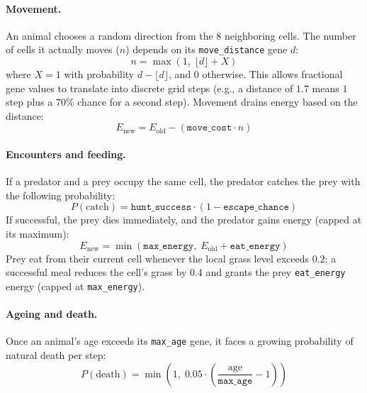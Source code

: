 \documentclass[english]{projectreport}
\begin{document}
\paragraph{Movement.} An animal chooses a random direction from the 8 neighboring cells. The number of cells it actually moves ($n$) depends on its \texttt{move\_distance} gene $d$:
\begin{equation}
n = \max(1,\; \lfloor d \rfloor + X)
\label{eq:cells_moved}
\end{equation}
where $X = 1$ with probability $d - \lfloor d \rfloor$, and $0$ otherwise. This allows fractional gene values to translate into discrete grid steps (e.g., a distance of $1.7$ means $1$ step plus a $70\%$ chance for a second step). Movement drains energy based on the distance:
\begin{equation}
E_{\text{new}} = E_{\text{old}} - (\texttt{move\_cost} \cdot n)
\label{eq:move_cost}
\end{equation}

\paragraph{Encounters and feeding.} If a predator and a prey occupy the same cell, the predator catches the prey with the following probability:
\begin{equation}
P(\text{catch}) = \texttt{hunt\_success} \cdot (1 - \texttt{escape\_chance})
\label{eq:catch}
\end{equation}
If successful, the prey dies immediately, and the predator gains energy (capped at its maximum):
\begin{equation}
E_{\text{new}} = \min(\texttt{max\_energy},\; E_{\text{old}} + \texttt{eat\_energy})
\label{eq:eat}
\end{equation}
Prey eat from their current cell whenever the local grass level exceeds $0.2$; a successful meal reduces the cell's grass by $0.4$ and grants the prey \texttt{eat\_energy} energy (capped at \texttt{max\_energy}).

\paragraph{Ageing and death.} Once an animal's age exceeds its \texttt{max\_age} gene, it faces a growing probability of natural death per step:
\begin{equation}
P(\text{death}) = \min\left(1,\; 0.05 \cdot \left(\frac{\text{age}}{\texttt{max\_age}} - 1\right)\right)
\label{eq:senescence}
\end{equation}
\end{document}
